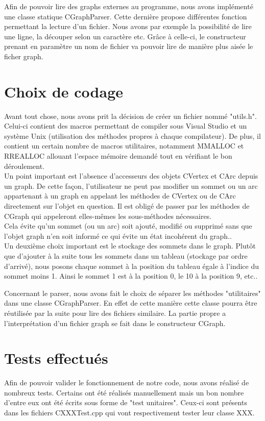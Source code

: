 		Afin de pouvoir lire des graphs externes au programme, nous avons implémenté une classe statique CGraphParser. Cette dernière propose différentes fonction permettant la lecture d'un fichier. Nous avons par exemple la possibilité de lire une ligne, la découper selon un caractère etc. Grâce à celle-ci, le constructeur prenant en paramètre un nom de fichier va pouvoir lire de manière plus aisée le ficher graph.
		
		
	\chapter{Choix de codage}
		Avant tout chose, nous avons prit la décision de créer un fichier nommé "utils.h". Celui-ci contient des macros permettant de compiler sous Visual Studio et un système Unix (utilisation des méthodes propres à chaque compilateur). De plus, il contient un certain nombre de macros utilitaires, notamment MMALLOC et RREALLOC allouant l'espace mémoire demandé tout en vérifiant le bon déroulement.\\
	
		Un point important est l'absence d'accesseurs des objets CVertex et CArc depuis un graph. De cette façon, l'utilisateur ne peut pas modifier un sommet ou un arc appartenant à un graph en appelant les méthodes de CVertex ou de CArc directement sur l'objet en question. Il est obligé de passer par les méthodes de CGraph qui appeleront elles-mêmes les sous-méthodes nécessaires.\\
		Cela évite qu'un sommet (ou un arc) soit ajouté, modifié ou supprimé sans que l'objet graph n'en soit informé ce qui évite un état incohérent du graph..\\
		
		Un deuxième choix important est le stockage des sommets dans le graph. Plutôt que d'ajouter à la suite tous les sommets dans un tableau (stockage par ordre d'arrivé), nous posons chaque sommet à la position du tableau égale à l'indice du sommet moins 1. Ainsi le sommet 1 est à la position 0, le 10 à la position 9, etc..
		
	
		Concernant le parser, nous avons fait le choix de séparer les méthodes "utilitaires" dans une classe CGraphParser. En effet de cette manière cette classe pourra être réutilisée par la suite pour lire des fichiers similaire. La partie propre a l'interprétation d'un fichier graph se fait dans le constructeur CGraph.	
	\chapter{Tests effectués}
		Afin de pouvoir valider le fonctionnement de notre code, nous avons réalisé de nombreux tests. Certains ont été réalisés manuellement mais un bon nombre d'entre eux ont été écrits sous forme de "test unitaires". Ceux-ci sont présents dans les fichiers CXXXTest.cpp qui vont respectivement tester leur classe XXX.
		
